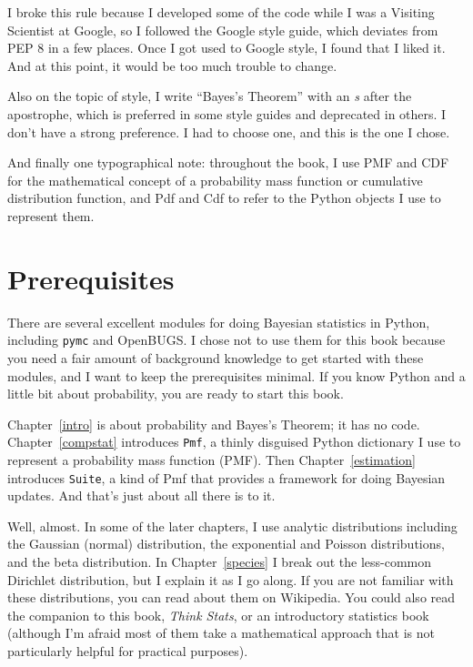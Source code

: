 \documentclass[12pt]{book}
\begin{document}
I broke this rule because I developed some of the code
while I was a Visiting Scientist at Google, so I followed
the Google style guide, which deviates from PEP 8 in a few
places.  Once I got used to Google style, I found that I liked
it.  And at this point, it would be too much trouble to change.

Also on the topic of style, I write ``Bayes's Theorem''
with an {\it s} after the apostrophe, which is preferred in some
style guides and deprecated in others.  I don't have a strong
preference.  I had to choose one, and this is the one I chose.

And finally one typographical note: throughout the book, I use
PMF and CDF for the mathematical concept of a probability
mass function or cumulative distribution function, and Pdf and Cdf
to refer to the Python objects I use to represent them.


\section{Prerequisites}

There are several excellent modules for doing Bayesian statistics in
Python, including {\tt pymc} and OpenBUGS.  I chose not to use them
for this book because you need a fair amount of background knowledge
to get started with these modules, and I want to keep the
prerequisites minimal.  If you know Python and a little bit about
probability, you are ready to start this book.

Chapter~\ref{intro} is about probability and Bayes's Theorem; it has
no code.  Chapter~\ref{compstat} introduces {\tt Pmf}, a thinly disguised
Python dictionary I use to represent a probability mass function
(PMF).  Then Chapter~\ref{estimation} introduces {\tt Suite}, a kind
of Pmf that provides a framework for doing Bayesian updates.  And
that's just about all there is to it.

Well, almost.  In some of the later chapters, I use
analytic distributions including the Gaussian (normal) distribution,
the exponential and Poisson distributions, and the beta distribution.
In Chapter~\ref{species} I break out the less-common Dirichlet
distribution, but I explain it as I go along.  If you are not familiar
with these distributions, you can read about them on Wikipedia.  You
could also read the companion to this book, {\it Think Stats}, or an
introductory statistics book (although I'm afraid most of them take
a mathematical approach that is not particularly helpful for practical
purposes).
\end{document}
